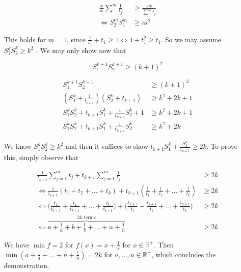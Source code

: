 \documentclass{article}
\begin{document}
\begin{align} \frac{x}{m}\sum^m\frac{1}{t_j} &\geq \frac{xm}{\sum^m t_j} \\
\iff S_2^mS_1^m &\geq m^2
\end{align}

This holds for $m=1$, since $\frac{1}{t_1}+t_1 \geq 1 \iff 1+t_1^2 \geq t_1$. So we may assume $S^k_1 S^k_2 \geq k^2$ . We may only show now that



\begin{equation}
S^{k+1}_1 S^{k+1}_2 \geq (k+1)^2
\end{equation}

\begin{align} S^{k+1}_1 S^{k+1}_2 &\geq (k+1)^2 \\
(S_1^k+\frac{1}{t_{t+1}})(S_2^k+t_{k+1}) &\geq k^2+2k+1 \\
S^k_1S^k_2+ t_{k+1}S_1^k + \frac{1}{t_{k+1}}S^k_2+1 &\geq k^2+2k+1 \\
S^k_1S^k_2+ t_{k+1}S_1^k + \frac{1}{t_{k+1}}S^k_2 &\geq k^2+2k
\end{align}

We know $S^k_1S^k_2 \geq k^2$ and then it suffices to show $t_{k+1}S_1^k + \frac{S^k_2}{t_{k+1}}\geq 2k$. To prove this, simply observe that

\begin{align}\frac{1}{t_{k+1}}\sum_{j=1}^mt_j+t_{k+1}\sum_{j=1}^m\frac{1}{t_{j}} &\geq 2k \\
\iff\frac{1}{t_{k+1}}(t_1+t_2+...+t_k)+t_{k+1}(\frac{1}{t_1}+\frac{1}{t_2}+...+\frac{1}{t_k}) &\geq 2k \\
\iff \Big(\frac{t_1}{t_{k+1}}+\frac{t_2}{t_{k+1}}+...+\frac{t_k}{t_{k+1}}\Big)+\Big(\frac{t_{k+1}}{t_1}+\frac{t_{k+1}}{t_2}+...+\frac{t_{k+1}}{t_k}\Big) &\geq 2k \\
\iff \overbrace{a+\frac{1}{a}+b+\frac{1}{b}+... + n+\frac{1}{n}}^{\text{$2k$ terms} } &\geq 2k
\end{align}

We have $\min f=2$  for $f(x)=x+\frac{1}{x}$ for $x \in \mathbb{R}^+$. Then $\min(a+\frac{1}{a}+...+n+\frac{1}{n})=2k$ for $a,..., n \in \mathbb{R}^+$, which concludes the demonstration.
\end{document}
